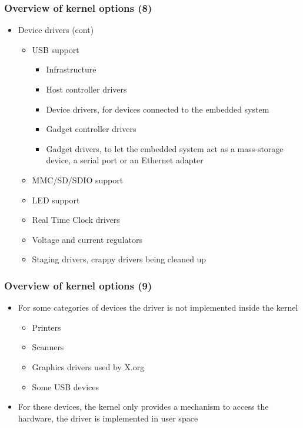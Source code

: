 \begin{frame}
  \frametitle{Overview of kernel options (8)}
  \begin{itemize}
  \item Device drivers (cont)
    \begin{itemize}
    \item USB support
      \begin{itemize}
      \item Infrastructure
      \item Host controller drivers
      \item Device drivers, for devices connected to the embedded system
      \item Gadget controller drivers
      \item Gadget drivers, to let the embedded system act as a
        mass-storage device, a serial port or an Ethernet adapter
      \end{itemize}
    \item MMC/SD/SDIO support
    \item LED support
    \item Real Time Clock drivers
    \item Voltage and current regulators
    \item Staging drivers, crappy drivers being cleaned up
    \end{itemize}
  \end{itemize}
\end{frame}

\begin{frame}
  \frametitle{Overview of kernel options (9)}
  \begin{itemize}
  \item For some categories of devices the driver is not implemented
    inside the kernel
    \begin{itemize}
    \item Printers
    \item Scanners
    \item Graphics drivers used by X.org
    \item Some USB devices
    \end{itemize}
  \item For these devices, the kernel only provides a mechanism to
    access the hardware, the driver is implemented in user space
  \end{itemize}
\end{frame}

